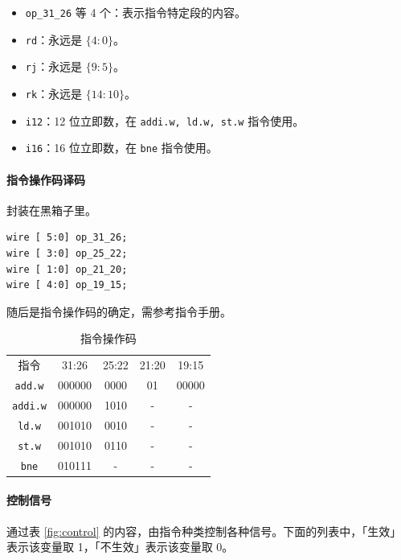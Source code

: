\documentclass[UTF8]{ctexart}
\begin{document}
\begin{itemize}
    \item \verb!op_31_26! 等 4 个：表示指令特定段的内容。
    \item \verb!rd!：永远是 $ \{4:0\} $。
    \item \verb!rj!：永远是 $ \{9:5\} $。
    \item \verb!rk!：永远是 $ \{14:10\} $。
    \item \verb!i12!：12 位立即数，在 \verb!addi.w, ld.w, st.w! 指令使用。
    \item \verb!i16!：16 位立即数，在 \verb!bne! 指令使用。
\end{itemize}

\paragraph{指令操作码译码}
封装在黑箱子里。

\begin{lstlisting}
wire [ 5:0] op_31_26;
wire [ 3:0] op_25_22;
wire [ 1:0] op_21_20;
wire [ 4:0] op_19_15;
\end{lstlisting}

随后是指令操作码的确定，需参考指令手册。

\begin{table}[H]
  \centering
  \begin{tabular}{ccccc}
    \rowcolor{cyan!50}
    指令 & 31:26 & 25:22 & 21:20 & 19:15  \\
      \verb!add.w! & 000000 & 0000 & 01 & 00000 \\
      \verb!addi.w! & 000000 & 1010 & - & - \\
      \verb!ld.w! & 001010 & 0010 & - & - \\
      \verb!st.w! & 001010 & 0110 & - &  - \\
      \verb!bne! & 010111 & - & - & - \\
  \end{tabular}
  \caption{指令操作码}\label{tab:operation}
\end{table}

\paragraph{控制信号}
通过表 \ref{fig:control} 的内容，由指令种类控制各种信号。下面的列表中，「生效」表示该变量取 1，「不生效」表示该变量取 0。
\end{document}
